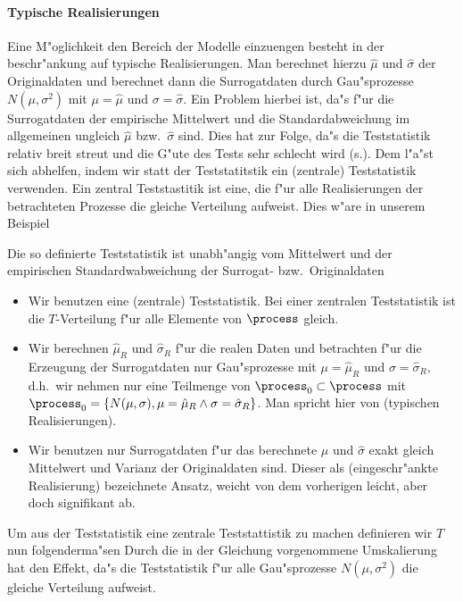 \paragraph{Typische Realisierungen}
Eine M"oglichkeit den Bereich der Modelle einzuengen besteht in der beschr"ankung auf
typische Realisierungen. Man berechnet hierzu $\hat\mu$ und $\hat\sigma$ der Originaldaten
und berechnet dann die Surrogatdaten durch Gau"sprozesse $N(\mu,\sigma^2)$ mit
$\mu=\hat\mu$ und $\sigma=\hat\sigma$. Ein Problem hierbei ist, da"s f"ur die
Surrogatdaten der empirische Mittelwert und die Standardabweichung im allgemeinen ungleich
$\hat\mu$ bzw.\ $\hat\sigma$ sind. Dies hat zur Folge, da"s die Teststatistik relativ
breit streut und die G"ute des Tests sehr schlecht wird (s.). Dem l"a"st sich
abhelfen, indem wir statt der Teststatitstik  ein
\begriff(zentrale) Teststatistik verwenden. Ein zentral Teststastitik ist eine, die f"ur
alle Realisierungen der betrachteten Prozesse die gleiche Verteilung aufweist. Dies w"are
in unserem Beispiel 

Die so definierte Teststatistik ist unabh"angig vom Mittelwert und der empirischen
Standardwabweichung der Surrogat- bzw.\ Originaldaten

\begin{itemize}
\item Wir benutzen eine \begriff(zentrale) Teststatistik. Bei einer zentralen
  Teststatistik ist die $T$-Verteilung f"ur alle Elemente von $\process$ gleich.
\item Wir berechnen $\hat\mu_R$ und $\hat\sigma_R$ f"ur die realen Daten und betrachten f"ur die
  Erzeugung der Surrogatdaten nur Gau"sprozesse mit $\mu=\hat\mu_R$ und $\sigma=\hat\sigma_R$,
  d.h.\ wir nehmen nur eine Teilmenge von $\process_0\subset\process$ mit
  $\process_0=\{N(\mu,\sigma),\mu=\hat\mu_R\land\sigma=\hat\sigma_R\}$. Man spricht hier von \begriff(typischen
  Realisierungen).
\item Wir benutzen nur Surrogatdaten f"ur das berechnete $\hat\mu$ und $\hat\sigma$ exakt gleich
  Mittelwert und Varianz der Originaldaten sind. Dieser als \begriff(eingeschr"ankte
  Realisierung) bezeichnete Ansatz, weicht von dem vorherigen leicht, aber doch
  signifikant ab.
\end{itemize}

Um aus der Teststatistik  eine zentrale Teststattistik zu machen definieren wir $T$
 nun folgenderma"sen
Durch die in der Gleichung vorgenommene Umskalierung hat den Effekt, da"s die Teststatistik
f"ur alle Gau"sprozesse $N(\mu,\sigma^2)$ die gleiche Verteilung aufweist. 


